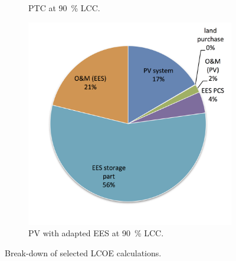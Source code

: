 \begin{figure}[!htbp]
\begin{subfigure}[b]{0.5\textwidth}
                \caption{PTC at \SI{90}{\percent} LCC.}\label{PTC_LCOE_90_BreakDown}
        \end{subfigure}
\par\medskip %
        \begin{subfigure}[b]{0.5\textwidth}
                \centering
                \includegraphics[width=1\textwidth]{FIG/PV_LCOE_90_BreakDown}
                \caption{PV with adapted EES at \SI{90}{\percent} LCC.}\label{PV_LCOE_90_BreakDown}
        \end{subfigure}
        \caption{Break-down of selected LCOE calculations.}\label{SMPV_LCOE_BreakDown}
\end{figure}


